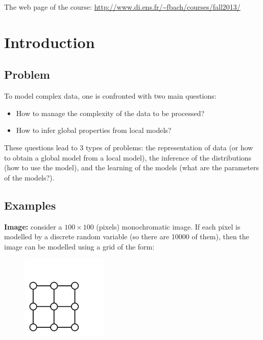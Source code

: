\documentclass[12pt]{report}	%
\begin{document}
\nocite{*}
	 

	
\maketitle

The web page of the course: \url{http://www.di.ens.fr/~fbach/courses/fall2013/}


\section{Introduction}

\subsection{Problem}
To model complex data, one is confronted with two main questions:
\begin{itemize}
\item How to manage the complexity of the data to be processed?
\item How to infer global properties from local models?
\end{itemize}
These questions lead to 3 types of problems: the representation of data (or how to obtain a global model from a local model), the inference of the distributions (how to use the model), and the learning of the models (what are the parameters of the models?).

\subsection{Examples}
\BIT
\item \textbf{Image:} consider a $100 \times 100$ (pixels) monochromatic image. If each pixel is modelled by a discrete random variable (so there are 10000 of them), then the image can be modelled using a grid of the form:
\begin{figure}[ht]
\begin{center}
\includegraphics[angle=0, height=4cm]{graphe_image.pdf}
\end{center}
\centering
\end{figure}
\end{document}
